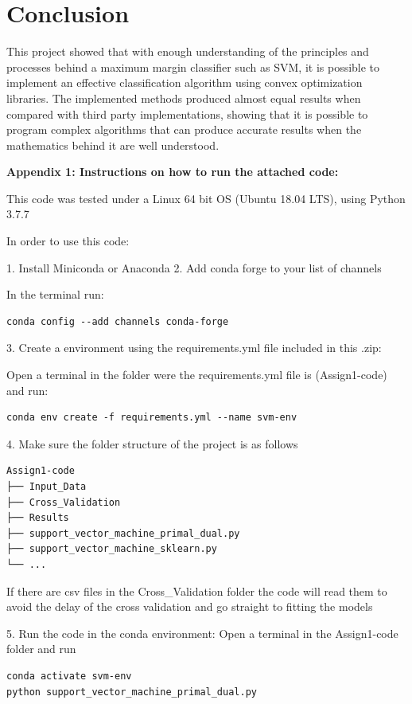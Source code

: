 \documentclass[11pt,twocolumn,letterpaper]{article}
\begin{document}
\section{Conclusion}

This project showed that with enough understanding of the principles and processes
behind a maximum margin classifier such as SVM, it is possible to implement an effective classification algorithm using convex optimization libraries. The implemented methods produced almost equal results when compared with third party implementations, showing that it is possible to program complex algorithms that can produce accurate results when the mathematics behind it are well understood.

{\small


}


\textbf{Appendix 1: Instructions on how to run the attached code:}

This code was tested under a Linux 64 bit OS (Ubuntu 18.04 LTS), using Python 3.7.7

In order to use this code:

1. Install Miniconda or Anaconda
2. Add conda forge to your list of channels

In the terminal run:
\begin{verbatim}
conda config --add channels conda-forge
\end{verbatim}

3. Create a environment using the requirements.yml file included in this .zip:

Open a terminal in the folder were the requirements.yml file is (Assign1-code) and run:

\begin{verbatim}
conda env create -f requirements.yml --name svm-env
\end{verbatim}

4. Make sure the folder structure of the project is as follows

\begin{verbatim}
Assign1-code
├── Input_Data
├── Cross_Validation
├── Results
├── support_vector_machine_primal_dual.py
├── support_vector_machine_sklearn.py
└── ...
\end{verbatim}

If there are csv files in the Cross\_Validation folder the code will read them to avoid the delay of the cross validation and go straight to fitting the models

5.  Run the code in the conda environment: Open a terminal in the Assign1-code folder  and run 
\begin{verbatim}
conda activate svm-env
python support_vector_machine_primal_dual.py
\end{verbatim}
\end{document}
